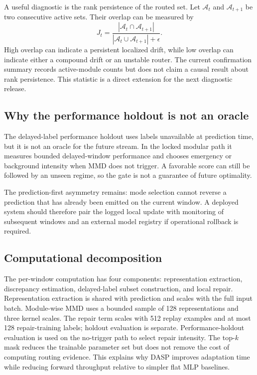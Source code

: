 A useful diagnostic is the rank persistence of the routed set. Let $\mathcal A_t$ and $\mathcal A_{t+1}$ be two consecutive active sets. Their overlap can be measured by
\begin{equation}
 J_t=\frac{|\mathcal A_t\cap\mathcal A_{t+1}|}{|\mathcal A_t\cup\mathcal A_{t+1}|+\epsilon}.
\end{equation}
High overlap can indicate a persistent localized drift, while low overlap can indicate either a compound drift or an unstable router. The current confirmation summary records active-module counts but does not claim a causal result about rank persistence. This statistic is a direct extension for the next diagnostic release.

\subsection{Why the performance holdout is not an oracle}
The delayed-label performance holdout uses labels unavailable at prediction time, but it is not an oracle for the future stream. In the locked modular path it measures bounded delayed-window performance and chooses emergency or background intensity when MMD does not trigger. A favorable score can still be followed by an unseen regime, so the gate is not a guarantee of future optimality.

The prediction-first asymmetry remains: mode selection cannot reverse a prediction that has already been emitted on the current window. A deployed system should therefore pair the logged local update with monitoring of subsequent windows and an external model registry if operational rollback is required.

\subsection{Computational decomposition}
The per-window computation has four components: representation extraction, discrepancy estimation, delayed-label subset construction, and local repair. Representation extraction is shared with prediction and scales with the full input batch. Module-wise MMD uses a bounded sample of 128 representations and three kernel scales. The repair term scales with 512 replay examples and at most 128 repair-training labels; holdout evaluation is separate. Performance-holdout evaluation is used on the no-trigger path to select repair intensity. The top-$k$ mask reduces the trainable parameter set but does not remove the cost of computing routing evidence. This explains why DASP improves adaptation time while reducing forward throughput relative to simpler flat MLP baselines.

